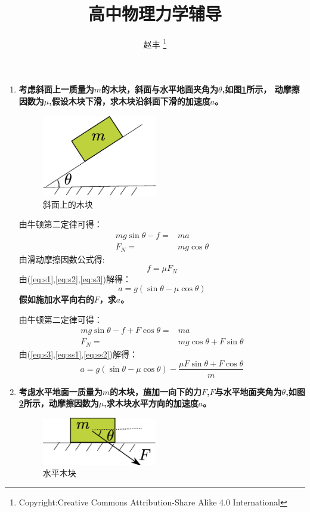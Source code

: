 \documentclass{article}
\begin{document}
\title{高中物理力学辅导}
\author{赵丰 \footnote{Copyright:Creative Commons Attribution-Share Alike 4.0 International}}
\maketitle
\begin{enumerate}
\item \textbf{考虑斜面上一质量为$m$的木块，斜面与水平地面夹角为$\theta$,如图\ref{fig:s}所示，
动摩擦因数为$\mu$,假设木块下滑，求木块沿斜面下滑的加速度$a$。}
\begin{figure}[!ht]
\centering
\includegraphics[width=5cm]{fig0.eps}
\caption{斜面上的木块}\label{fig:s}
\end{figure}

由牛顿第二定律可得：
\begin{align}\label{eq:s1}
mg\sin\theta -f =&  ma \\
F_N =& mg\cos\theta \label{eq:s2}
\end{align}
由滑动摩擦因数公式得:
\begin{equation}\label{eq:s3}
f=\mu F_N
\end{equation}
由(\ref{eq:s1},\ref{eq:s2},\ref{eq:s3})解得：
\begin{equation}
a= g(\sin\theta-\mu\cos\theta)
\end{equation}
\textbf{假如施加水平向右的$F$，求$a$。}

由牛顿第二定律可得：
\begin{align}\label{eq:ss1}
mg\sin\theta -f+F\cos\theta =&  ma \\
F_N = & mg\cos\theta + F\sin\theta \label{eq:ss2}
\end{align}
由(\ref{eq:s3},\ref{eq:ss1},\ref{eq:ss2})解得：
\begin{equation}
a= g(\sin\theta-\mu\cos\theta)-\frac{\mu F\sin\theta+F\cos\theta}{m}
\end{equation}

\item \textbf{考虑水平地面一质量为$m$的木块，施加一向下的力$F$,$F$与水平地面夹角为$\theta$,如图\ref{fig:h}所示，动摩擦因数为$\mu$,求木块水平方向的加速度$a$。}
\begin{figure}[!ht]
\centering
\includegraphics[width=5cm]{fig1.eps}
\caption{水平木块}\label{fig:h}
\end{figure}


\end{enumerate}
\end{document}

